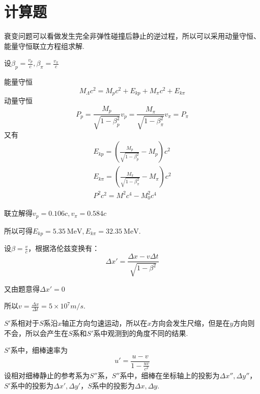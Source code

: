 \documentclass[b5paper,opensource,sourcefont,parskip]{qyxf-book}
\begin{document}
\section{计算题}

\analysis
衰变问题可以看做发生完全非弹性碰撞后静止的逆过程，所以可以采用动量守恒、能量守恒联立方程组求解.

\solve 
设$\beta_p=\frac{v_p}{c},\beta_\pi=\frac{v_\pi}{c}$

能量守恒
\begin{equation*}
M_\Lambda c^2=M_pc^2+E_{kp}+M_\pi c^2+E_{k\pi}
\end{equation*}
动量守恒
\begin{equation*}
P_p=\frac{M_p}{\sqrt{1-\beta_p^2}}v_p=\frac{M_\pi}{\sqrt{1-\beta_\pi^2}}v_\pi=P_\pi
\end{equation*}
又有
\begin{align*}
E_{kp}=(\frac{M_p}{\sqrt{1-\beta_p^2}}-M_p)c^2\\
E_{k\pi}=(\frac{M_\pi}{\sqrt{1-\beta_\pi^2}}-M_\pi)c^2\\
P^2c^2=M^2c^4-M_0^2c^4
\end{align*}

联立解得$v_p=0.106c,v_\pi=0.584c$

所以可得$E_{kp}=5.35\ \mathrm{MeV},E_{k\pi}=32.35\ \mathrm{MeV}$.


\solve 
设$\beta=\frac{v}{c}$，根据洛伦兹变换有：
\begin{equation*}
\Delta x'=\frac{\Delta x-v\Delta t}{\sqrt{1-\beta^2}}
\end{equation*}

又由题意得$\Delta x'=0$

所以$v=\frac{\Delta x}{\Delta t}=5\times10^7m/s$.


\analysis
$S'$系相对于$S$系沿$x$轴正方向匀速运动，所以在$x$方向会发生尺缩，但是在$y$方向则不会，所以会产生在$S$系和$S'$系中观测到的角度不同的结果.

\solve
$S'$系中，细棒速率为
\begin{equation*}
u'=\frac{u-v}{1-\frac{uv}{c^2}}
\end{equation*}
设相对细棒静止的参考系为$S''$系，$S''$系中，细棒在坐标轴上的投影为$\Delta x'',\Delta y''$，$S'$系中的投影为$\Delta x',\Delta y'$，$S$系中的投影为$\Delta x,\Delta y$.
\end{document}
